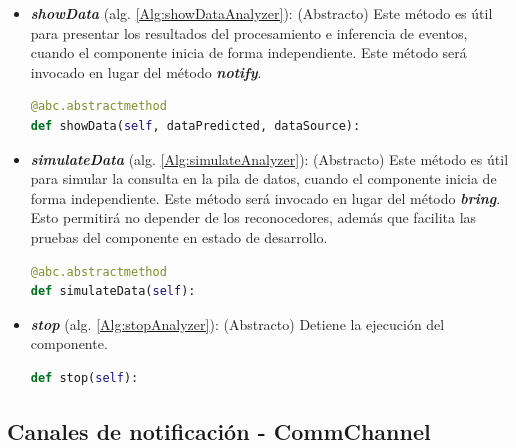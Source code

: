         \begin{itemize}
            
            \item \textbf{\textit{showData}} (alg. \ref{Alg:showDataAnalyzer}):
            (Abstracto) Este método es útil para presentar los resultados del procesamiento e inferencia de eventos, cuando el componente inicia de forma independiente. Este método será invocado en lugar del método \textbf{\textit{notify}}.
            \begin{lstlisting}[language=Python, caption={Firma del método ``\textit{showData}'' de la clase EventAnalyzer.}, label=Alg:showDataAnalyzer, numbers=none]
@abc.abstractmethod
def showData(self, dataPredicted, dataSource):
            \end{lstlisting}
            
            \item \textbf{\textit{simulateData}} (alg. \ref{Alg:simulateAnalyzer}):
            (Abstracto) Este método es útil para simular la consulta en la pila de datos, cuando el componente inicia de forma independiente. Este método será invocado en lugar del método \textbf{\textit{bring}}. Esto permitirá no depender de los reconocedores, además que facilita las pruebas del componente en estado de desarrollo.
            \begin{lstlisting}[language=Python, caption={Firma del método ``\textit{simulateData}''.}, label=Alg:simulateAnalyzer, numbers=none]
@abc.abstractmethod
def simulateData(self):
            \end{lstlisting}
            
            \item \textbf{\textit{stop}} (alg. \ref{Alg:stopAnalyzer}): (Abstracto) Detiene la ejecución del componente. 
            \begin{lstlisting}[language=Python, caption={Firma del método "\textit{stop}" de la clase EventAnalyzer.}, label=Alg:stopAnalyzer, numbers=none]
def stop(self):
            \end{lstlisting}
            
        \end{itemize}
    
    \subsection{Canales de notificación - CommChannel}
    \label{sub:CommChannel}
        
